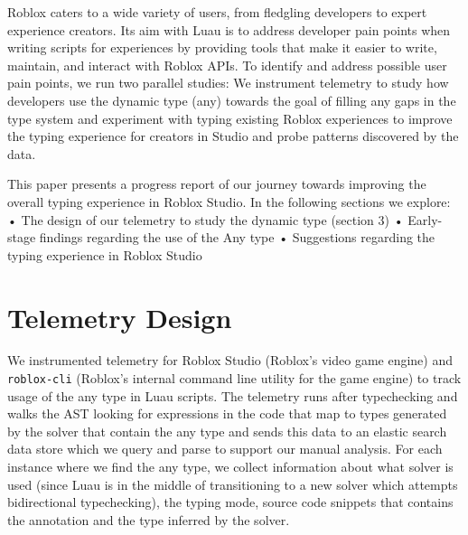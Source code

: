 \documentclass[acmsmall,screen,review,anonymous]{acmart}
\newcommand{\code}[1]{\texttt{#1}}
\begin{document}

Roblox caters to a wide variety of users, from fledgling 
developers to expert experience creators. Its aim with Luau is to address developer pain 
points when writing scripts for experiences by providing tools that make 
it easier to write, maintain, and interact with Roblox APIs. To identify and address 
possible user pain points, we run two parallel studies: We instrument telemetry 
to study how developers use the dynamic type (any) towards the goal of filling 
any gaps in the type system and experiment with typing existing Roblox experiences 
to improve the typing experience for creators in Studio and probe patterns discovered 
by the data.

This paper presents a progress report of our journey towards improving the overall 
typing experience in Roblox Studio. In the following sections we explore:
 • The design of our telemetry to study the dynamic type (section 3)
 • Early-stage findings regarding the use of the Any type
 • Suggestions regarding the typing experience in Roblox Studio



\section{Telemetry Design}
\label{s:approach:1}
We instrumented telemetry for Roblox Studio (Roblox's video game engine) and \code{roblox-cli} 
(Roblox's internal command line utility for the game engine) to track usage of the any type in 
Luau scripts. The telemetry runs after typechecking and walks the AST 
looking for expressions in the code that map to types generated by the solver that 
contain the any type and sends this data to an elastic search data store which we query and 
parse to support our manual analysis. For each instance where we find the any type, we 
collect information about what solver is used (since Luau is in the middle of transitioning 
to a new solver which attempts bidirectional typechecking), the typing mode, source code snippets that 
contains the annotation and the type inferred by the solver.
\end{document}

